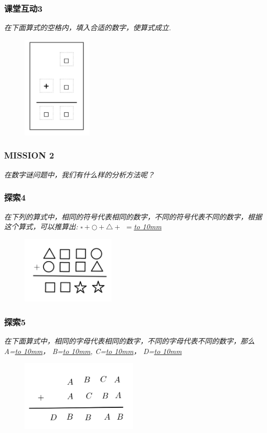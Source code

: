 \begin{frame}
    \frametitle{课堂互动3}
    \textit{在下面算式的空格内，填入合适的数字，使算式成立.}
    \begin{figure}[H] 
        \centering
        \includegraphics[width=0.3\textwidth]{./pics/Chapter_3/ketanghudong3.png}
    \end{figure}
\end{frame}


\begin{frame}
    \frametitle{MISSION 2}
    \vspace*{-2cm}
    \textit{在数字谜问题中，我们有什么样的分析方法呢？}
\end{frame}

\begin{frame}
    \frametitle{探索4}
    \textit{在下列的算式中，相同的符号代表相同的数字，不同的符号代表不同的数字，根据这个算式，可以推算出: $\square + \bigcirc + \triangle +$  $=$\underline{\hbox to 10mm{}}}
    \begin{figure}[H] 
        \centering
        \includegraphics[width=0.4\textwidth]{./pics/Chapter_3/tansuo4.png}
    \end{figure}
\end{frame}

\begin{frame}
    \frametitle{探索5}
    \textit{在下面算式中，相同的字母代表相同的数字，不同的字母代表不同的数字，那么
    A=\underline{\hbox to 10mm{}}， 
    B=\underline{\hbox to 10mm{}},
    C=\underline{\hbox to 10mm{}}，
    D=\underline{\hbox to 10mm{}}}
    \begin{figure}[H] 
        \centering
        \includegraphics[width=0.5\textwidth]{./pics/Chapter_3/tansuo5.png}
    \end{figure}
\end{frame}

